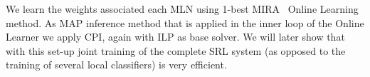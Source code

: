 We learn the weights associated each MLN using 1-best MIRA~\citep{crammer01ultraconservative} Online Learning method. As MAP inference method that is applied in the inner loop of the Online Learner we apply CPI, again with ILP as base solver. We will later show that with this set-up joint training of the complete SRL system (as opposed to the training of several local classifiers) is very efficient.  



